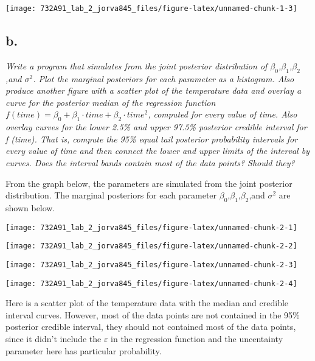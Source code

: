 \documentclass[]{article}
\begin{document}
\begin{center}\texttt{[image: 732A91\_lab\_2\_jorva845\_files/figure-latex/unnamed-chunk-1-3]} \end{center}

\hypertarget{b.}{%
\subsection{b.}\label{b.}}

\emph{Write a program that simulates from the joint posterior
distribution of \(\beta_0\),\(\beta_1\),\(\beta_2\),and \(\sigma^2\).
Plot the marginal posteriors for each parameter as a histogram. Also
produce another figure with a scatter plot of the temperature data and
overlay a curve for the posterior median of the regression function
\(f(time)=\beta_0 +\beta_1 \cdot time+\beta_2\cdot time^2\), computed
for every value of time. Also overlay curves for the lower 2.5\% and
upper 97.5\% posterior credible interval for f (time). That is, compute
the 95\% equal tail posterior probability intervals for every value of
time and then connect the lower and upper limits of the interval by
curves. Does the interval bands contain most of the data points? Should
they?}

From the graph below, the parameters are simulated from the joint
posterior distribution. The marginal posteriors for each parameter
\(\beta_0\),\(\beta_1\),\(\beta_2\),and \(\sigma^2\) are shown below.

\begin{center}\texttt{[image: 732A91\_lab\_2\_jorva845\_files/figure-latex/unnamed-chunk-2-1]} \end{center}

\begin{center}\texttt{[image: 732A91\_lab\_2\_jorva845\_files/figure-latex/unnamed-chunk-2-2]} \end{center}

\begin{center}\texttt{[image: 732A91\_lab\_2\_jorva845\_files/figure-latex/unnamed-chunk-2-3]} \end{center}

\begin{center}\texttt{[image: 732A91\_lab\_2\_jorva845\_files/figure-latex/unnamed-chunk-2-4]} \end{center}

Here is a scatter plot of the temperature data with the median and
credible interval curves. However, most of the data points are not
contained in the 95\% posterior credible interval, they should not
contained most of the data points, since it didn't include the
\(\varepsilon\) in the regression function and the uncentainty parameter
here has particular probability.
\end{document}
